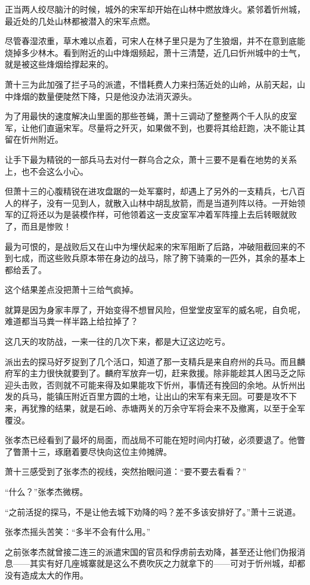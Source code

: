 正当两人绞尽脑汁的时候，城外的宋军却开始在山林中燃放烽火。紧邻着忻州城，最近处的几处山林都被潜入的宋军点燃。

尽管春湿浓重，草木难以点着，可宋人在林子里只是为了生狼烟，并不在意到底能烧掉多少林木。看到附近的山中烽烟频起，萧十三清楚，近几曰忻州城中的士气，就是被这些烽烟给撑起来的。

萧十三为此加强了拦子马的派遣，不惜耗费人力来扫荡近处的山岭，从前天起，山中烽烟的数量便陡然下降，只是他没办法消灭源头。

为了用最快的速度解决山里面的那些苍蝇，萧十三调动了整整两个千人队的皮室军，让他们直逼宋军。尽量将之歼灭，如果做不到，也要将其给赶跑，决不能让其留在忻州附近。

让手下最为精锐的一部兵马去对付一群乌合之众，萧十三要不是看在地势的关系上，也不会这么小心。

但萧十三的心腹精锐在进攻盘踞的一处军寨时，却遇上了另外的一支精兵，七八百人的样子，没有一见到人，就散入山林中胡乱放箭，而是当道列阵以待。一开始领军的辽将还以为是装模作样，可他领着这一支皮室军冲着军阵撞上去后转眼就败了，而且是惨败！

最为可恨的，是战败后又在山中为埋伏起来的宋军阻断了后路，冲破阻截回来的不到七成，而这些败兵原本带在身边的战马，除了胯下骑乘的一匹外，其余的基本上都给丢了。

这个结果差点没把萧十三给气疯掉。

就算是因为身家丰厚了，开始变得不想冒风险，但堂堂皮室军的威名呢，自负呢，难道都当马粪一样半路上给拉掉了？

这几天的攻防战，一来一往的几次下来，都是大辽这边吃亏。

派出去的探马好歹捉到了几个活口，知道了那一支精兵是来自府州的兵马。而且麟府军的主力很快就要到了。麟府军放弃一切，赶来救援。除非能趁其人困马乏之际迎头击败，否则就不可能来得及如果能攻下忻州，事情还有挽回的余地。从忻州出发的兵马，能镇压附近百里方圆的土地，让出山的宋军有来无回。可要是攻不下来，再犹豫的结果，就是石岭、赤塘两关的万余守军将会来不及撤离，以至于全军覆没。

张孝杰已经看到了最坏的局面，而战局不可能在短时间内打破，必须要退了。他瞥了瞥萧十三，琢磨着要尽快向这位主帅摊牌。

萧十三感受到了张孝杰的视线，突然抬眼问道：“要不要去看看？”

“什么？”张孝杰微楞。

“之前活捉的探马，不是让他去城下劝降的吗？差不多该安排好了。”萧十三说道。

张孝杰摇头苦笑：“多半不会有什么用。”

之前张孝杰就曾接二连三的派遣宋国的官员和俘虏前去劝降，甚至还让他们伪报消息——其实有好几座城寨就是这么不费吹灰之力就拿下的——可对于忻州城，却都没有造成太大的作用。

